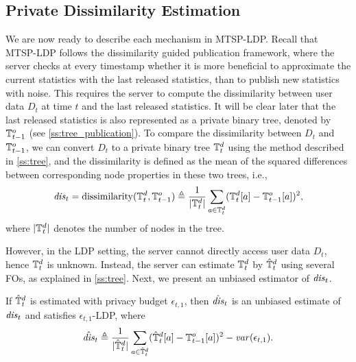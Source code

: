 \subsection{Private Dissimilarity Estimation}

We are now ready to describe each mechanism in MTSP-LDP.
Recall that MTSP-LDP follows the dissimilarity guided publication framework,
where the server checks at every timestamp whether it is more beneficial to
approximate the current statistics with the last released statistics, than to
publish new statistics with noise.
This requires the server to compute the dissimilarity between user data $D_t$ at
time $t$ and the last released statistics.
It will be clear later that the last released statistics is also represented as
a private binary tree, denoted by $\mathbb{T}^o_{t-1}$ (see \cref{ss:tree_publication}).
To compare the dissimilarity between $D_t$ and $\mathbb{T}^o_{t-1}$, we can convert $D_t$
to a private binary tree $\mathbb{T}^d_t$ using the method described in \cref{ss:tree},
and the dissimilarity is defined as the mean of the squared differences between
corresponding node properties in these two trees, i.e.,
\[
  \mathit{dis}_t = \mathrm{dissimilarity}(\mathbb{T}^d_t, \mathbb{T}^o_{t-1}) \triangleq
  \frac{1}{|\mathbb{T}^d_t|}\sum_{a\in \mathbb{T}^d_t}(\mathbb{T}^d_t[a] - \mathbb{T}^o_{t-1}[a])^2,
\]
where $|\mathbb{T}^d_t|$ denotes the number of nodes in the tree.

However, in the LDP setting, the server cannot directly access user data $D_t$,
hence $\mathbb{T}^d_t$ is unknown.
Instead, the server can estimate $\mathbb{T}^d_t$ by $\hat{\mathbb{T}}^d_t$ using several FOs, as
explained in \cref{ss:tree}.
Next, we present an unbiased estimator of $\mathit{dis}_t$.

\begin{theorem}\label{thm:dis}
  If $\hat{\mathbb{T}}^d_t$ is estimated with privacy budget $\epsilon_{t,1}$, then $\hat{\mathit{dis}}_t$
  is an unbiased estimate of $\mathit{dis}_t$ and satisfies $\epsilon_{t,1}$-LDP, where
  \[
    \hat{\mathit{dis}}_t\triangleq\frac{1}{|\hat{\mathbb{T}}^d_t|}
    \sum_{a\in\hat{\mathbb{T}}^d_t} (\hat{\mathbb{T}}^d_t[a] - \mathbb{T}^o_{t-1}[a])^2 - \mathit{var}(\epsilon_{t,1}).
  \]
\end{theorem}


